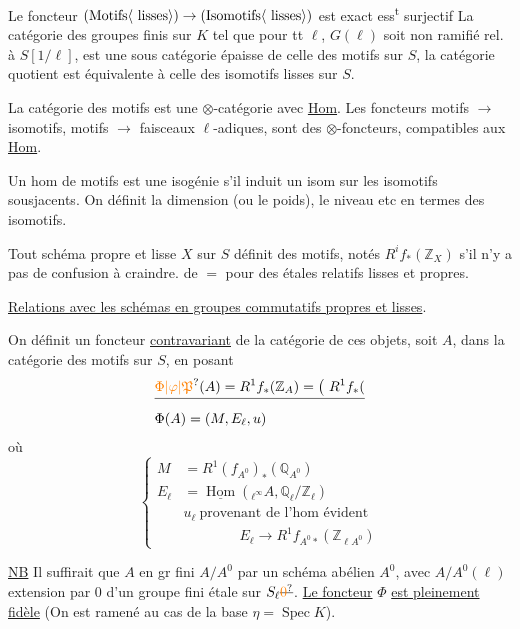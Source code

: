 Le foncteur $(\text{Motifs}\inserted{\text{ lisses}})\to(\text{Isomotifs}\inserted{\text{ lisses}})$ est exact ess\textsuperscript{t} surjectif
La catégorie des groupes finis  sur $K$ tel que pour tt $\ell$, $G(\ell)$ soit non ramifié rel. à $S[1/\ell]$, est une sous catégorie épaisse de celle des motifs sur $S$, la catégorie quotient est équivalente à celle des isomotifs lisses sur $S$.

La catégorie des motifs est une $\otimes$-catégorie avec \uline{Hom}. Les foncteurs motifs $\longrightarrow$ isomotifs, motifs $\to$ faisceaux $\ell$-adiques, sont des $\otimes$-foncteurs, compatibles aux \uline{Hom}.

Un  hom de motifs est une isogénie s'il induit un isom sur les isomotifs sousjacents. On définit la dimension (ou le poids), le niveau etc en termes des isomotifs.

Tout schéma propre et lisse $X$ sur $S$ définit des motifs, notés $R^i f_*(\mathbb Z_X)$ s'il n'y a pas de confusion à craindre. de $=$ pour des  étales relatifs lisses et propres.

\uline{Relations avec les schémas en groupes commutatifs propres et lisses}.

On définit un foncteur \uline{contravariant} de la catégorie de ces objets, soit $A$, dans la catégorie des motifs sur $S$, en posant
\[
\begin{aligned}
&\deleted{\unsure{\Phi|\varphi|\mathfrak P}(A)=R^1 f_*(\mathbb Z_A)=\bigl(\ R^1 f_*(\bigr.}\\
&\Phi(A)=(M,E_\ell,u)
\end{aligned}
\]
où
\[
\left\{\begin{aligned}
 M&=R^1(f_{A^0})_*(\mathbb Q_{A^0})\\
 E_\ell&=\underline{\operatorname{Hom}}({}_{\ell^\infty}A,\mathbb Q_\ell/\mathbb Z_\ell)\\
 &u_\ell\ \text{provenant de l'hom évident}\\
 &\hspace{4em}E_\ell\longrightarrow R^1 f_{A^0*}(\mathbb Z_{\ell A^0})
\end{aligned}\right.
\]

\uline{NB} Il suffirait que $A$   en gr fini $A/A^0$ par un schéma abélien $A^0$, avec $A/A^0(\ell)$ extension par $0$ d'un groupe fini étale sur $S_\ell\deleted{\unsure{0}}$.
\uline{Le foncteur} $\Phi$ \uline{est pleinement fidèle} (On est ramené au cas de la base $\eta=\operatorname{Spec}K$).

